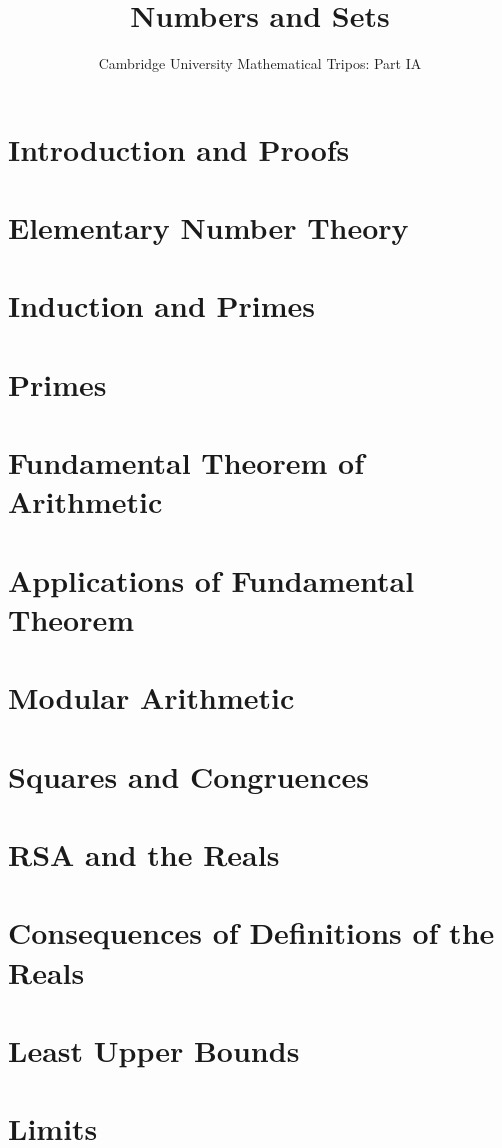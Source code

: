\documentclass{article}
\title{Numbers and Sets}
\author{Cambridge University Mathematical Tripos: Part IA}
\begin{document}
\maketitle

\tableofcontentsnewpage

\section{Introduction and Proofs}

\section{Elementary Number Theory}

\section{Induction and Primes}

\section{Primes}

\section{Fundamental Theorem of Arithmetic}

\section{Applications of Fundamental Theorem}

\section{Modular Arithmetic}

\section{Squares and Congruences}

\section{RSA and the Reals}

\section{Consequences of Definitions of the Reals}

\section{Least Upper Bounds}

\section{Limits}

\end{document}
